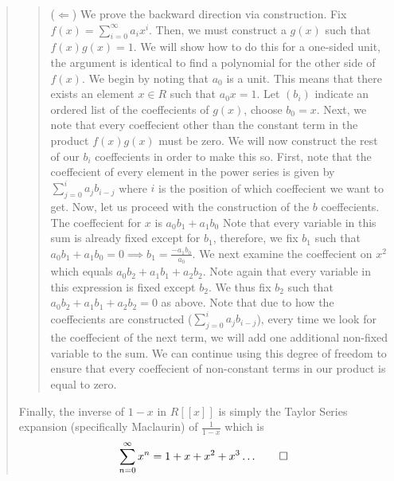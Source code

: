 \documentclass{article}
\begin{document}
\begin{enumerate}
\begin{quote}
                \begin{quote}
                    ($\Leftarrow$) We prove the backward direction via construction. Fix $f(x) = \sum_{i = 0}^\infty a_ix^i$. Then, we must construct
                    a $g(x)$ such that $f(x)g(x) = 1$. We will show how to do this for a one-sided unit, the argument is identical to find a polynomial for
                    the other side of $f(x)$. We begin by noting that $a_0$ is a unit. This means that there exists an element $x \in R$ such that $a_0x = 1$.
                    Let $(b_i)$ indicate an ordered list of the coeffecients of $g(x)$, choose $b_0 = x$. Next, we note that every coeffecient other than the 
                    constant term in the product $f(x)g(x)$ must be zero. We will now construct the rest of our $b_i$ coeffecients in order to make this so.
                    First, note that the coeffecient of every element in the power series is given by $\sum_{j = 0}^ia_jb_{i-j}$ where $i$ is the position of
                    which coeffecient we want to get. Now, let us proceed with the construction of the $b$ coeffecients. The coeffecient for $x$ is $a_0b_1 + a_1b_0$
                    Note that every variable in this sum is already fixed except for $b_1$, therefore, we fix $b_1$ such that $a_0b_1 + a_1b_0 = 0 \implies 
                    b_1 = \frac{-a_1b_0}{a_0}$. We next examine the coeffecient on $x^2$ which equals $a_0b_2 + a_1b_1 + a_2b_2$. Note again that every variable
                    in this expression is fixed except $b_2$. We thus fix $b_2$ such that $a_0b_2 + a_1b_1 + a_2b_2 = 0$ as above. Note that due to how the 
                    coeffecients are constructed ($\sum_{j = 0}^ia_jb_{i-j}$), every time we look for the coeffecient of the next term, we will add one additional
                    non-fixed variable to the sum. We can continue using this degree of freedom to ensure that every coeffecient of non-constant terms in our
                    product is equal to zero. 
                \end{quote}
                Finally, the inverse of $1 - x$ in $R[[x]]$ is simply the Taylor Series expansion (specifically Maclaurin) of $\frac{1}{1-x}$ which is
                \begin{equation*}
                    \sum_{n = 0}^\infty x^n = 1 + x + x^2 + x^3\dots \qed
                \end{equation*}
            \end{quote}
    \end{enumerate}
\end{document}
